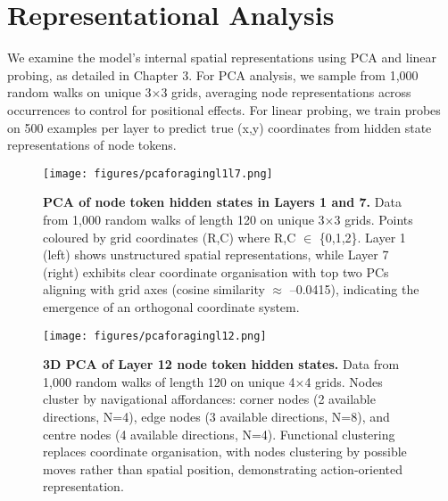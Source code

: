 \section{Representational Analysis}


We examine the model's internal spatial representations using PCA and linear probing, as detailed in Chapter 3. For PCA analysis, we sample from 1,000 random walks on unique 3$\times$3 grids, averaging node representations across occurrences to control for positional effects. For linear probing, we train probes on 500 examples per layer to predict true (x,y) coordinates from hidden state representations of node tokens.

\begin{figure}[h]
\centering
\texttt{[image: figures/pcaforagingl1l7.png]}
\caption[PCA of node token hidden states in Layers 1 and 7.]{\textbf{PCA of node token hidden states in Layers 1 and 7.} Data from 1,000 random walks of length 120 on unique 3$\times$3 grids. Points coloured by grid coordinates (R,C) where R,C $\in$ \{0,1,2\}. Layer 1 (left) shows unstructured spatial representations, while Layer 7 (right) exhibits clear coordinate organisation with top two PCs aligning with grid axes (cosine similarity $\approx$ --0.0415), indicating the emergence of an orthogonal coordinate system.}
\label{fig:pca_layers_1_7}
\end{figure}

\begin{figure}[h]
\centering
\texttt{[image: figures/pcaforagingl12.png]}
\caption[3D PCA of Layer 12 node token hidden states.]{\textbf{3D PCA of Layer 12 node token hidden states.} Data from 1,000 random walks of length 120 on unique 4$\times$4 grids. Nodes cluster by navigational affordances: corner nodes (2 available directions, N=4), edge nodes (3 available directions, N=8), and centre nodes (4 available directions, N=4). Functional clustering replaces coordinate organisation, with nodes clustering by possible moves rather than spatial position, demonstrating action-oriented representation.}
\label{fig:pca_layer_12}
\end{figure}


